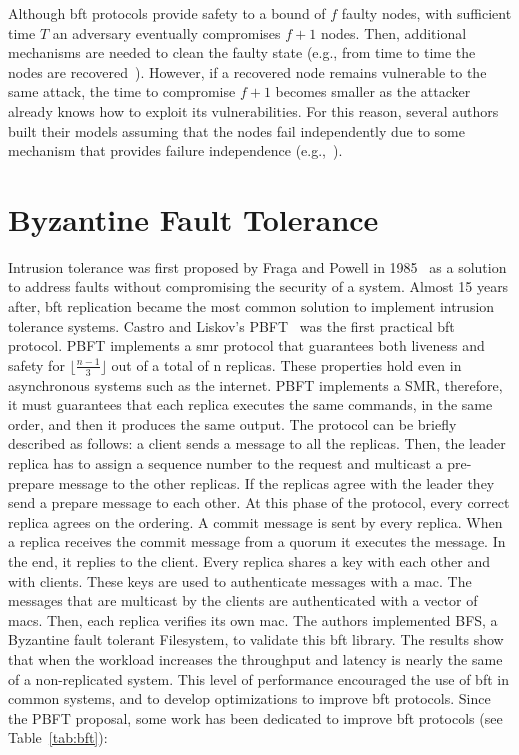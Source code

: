 Although \gls{bft} protocols provide safety to a bound of $f$ faulty nodes, with sufficient time $T$ an adversary eventually compromises $f+1$ nodes.
Then, additional mechanisms are needed to clean the faulty state (e.g., from time to time the nodes are recovered~\cite{Castro:2002}).
However, if a recovered node remains vulnerable to the same attack, the time to compromise $f+1$ becomes smaller as the attacker already knows how to exploit its vulnerabilities.
For this reason, several authors built their models assuming that the nodes fail independently due to some mechanism that provides failure independence (e.g.,~\cite{Castro:2002,Veronese:2013,Sousa:2010}).


\section{Byzantine Fault Tolerance}

Intrusion tolerance was first proposed by Fraga and Powell in 1985~\cite{Fraga:1985} as a solution to address faults without compromising the security of a system. 
Almost 15 years after, \gls{bft} replication became the most common solution to implement intrusion tolerance systems.
Castro and Liskov’s PBFT~\cite{Castro:1999} was the first practical \gls{bft} protocol. 
PBFT implements a \gls{smr} protocol that guarantees both liveness and safety for $\lfloor\frac{n-1}{3}\rfloor$ out of a total of n replicas. 
These properties hold even in asynchronous systems such as the internet. 
PBFT implements a SMR, therefore, it must guarantees that each replica executes the same commands, in the same order, and then it produces the same output. 
The protocol can be briefly described as follows: a client sends a message to all the replicas.
Then, the leader replica has to assign a sequence number to the request and multicast a pre-prepare message to the other replicas. 
If the replicas agree with the leader they send a prepare message to each other. 
At this phase of the protocol, every correct replica agrees on the ordering. 
A commit message is sent by every replica. When a replica receives the commit message from a quorum it executes the message. 
In the end, it replies to the client. 
Every replica shares a key with each other and with clients. These keys are used to authenticate messages with a \gls{mac}. 
The messages that are multicast by the clients are authenticated with a vector of \glspl{mac}. 
Then, each replica verifies its own \gls{mac}.
The authors implemented BFS, a Byzantine fault tolerant Filesystem, to validate this \gls{bft} library. 
The results show that when the workload increases the throughput and latency is nearly the same of a non-replicated system. 
This level of performance encouraged the use of \gls{bft} in common systems, and to develop optimizations to improve \gls{bft} protocols. 
Since the PBFT proposal, some work has been dedicated to improve \gls{bft} protocols (see Table~\ref{tab:bft}):


